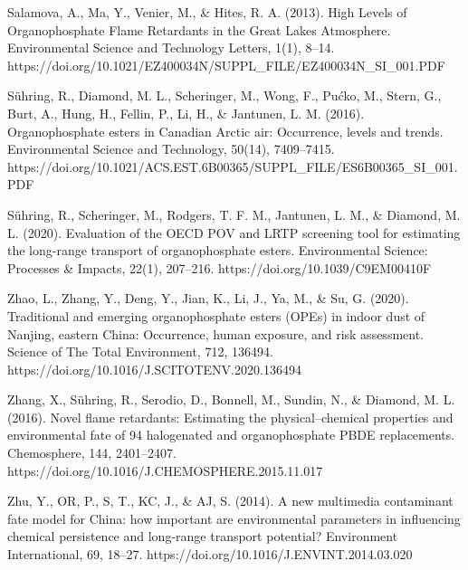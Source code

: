 \documentclass[journal=jacsat,manuscript=article]{achemso}
\begin{document}
Salamova, A., Ma, Y., Venier, M., \& Hites, R. A. (2013). High Levels of
Organophosphate Flame Retardants in the Great Lakes Atmosphere.
Environmental Science and Technology Letters, 1(1), 8--14.
https://doi.org/10.1021/EZ400034N/SUPPL\_FILE/EZ400034N\_SI\_001.PDF

Sühring, R., Diamond, M. L., Scheringer, M., Wong, F., Pućko, M., Stern,
G., Burt, A., Hung, H., Fellin, P., Li, H., \& Jantunen, L. M. (2016).
Organophosphate esters in Canadian Arctic air: Occurrence, levels and
trends. Environmental Science and Technology, 50(14), 7409--7415.
https://doi.org/10.1021/ACS.EST.6B00365/SUPPL\_FILE/ES6B00365\_SI\_001.PDF

Sühring, R., Scheringer, M., Rodgers, T. F. M., Jantunen, L. M., \&
Diamond, M. L. (2020). Evaluation of the OECD POV and LRTP screening
tool for estimating the long-range transport of organophosphate esters.
Environmental Science: Processes \& Impacts, 22(1), 207--216.
https://doi.org/10.1039/C9EM00410F

Zhao, L., Zhang, Y., Deng, Y., Jian, K., Li, J., Ya, M., \& Su, G.
(2020). Traditional and emerging organophosphate esters (OPEs) in indoor
dust of Nanjing, eastern China: Occurrence, human exposure, and risk
assessment. Science of The Total Environment, 712, 136494.
https://doi.org/10.1016/J.SCITOTENV.2020.136494

Zhang, X., Sühring, R., Serodio, D., Bonnell, M., Sundin, N., \&
Diamond, M. L. (2016). Novel flame retardants: Estimating the
physical--chemical properties and environmental fate of 94 halogenated
and organophosphate PBDE replacements. Chemosphere, 144, 2401--2407.
https://doi.org/10.1016/J.CHEMOSPHERE.2015.11.017

Zhu, Y., OR, P., S, T., KC, J., \& AJ, S. (2014). A new multimedia
contaminant fate model for China: how important are environmental
parameters in influencing chemical persistence and long-range transport
potential? Environment International, 69, 18--27.
https://doi.org/10.1016/J.ENVINT.2014.03.020
\end{document}
